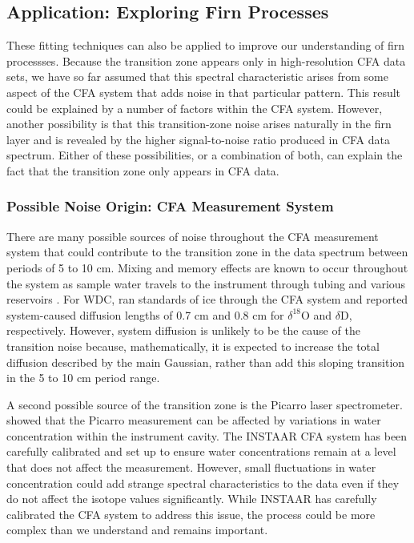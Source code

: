 \documentclass[draft, jgrga]{AGUTeX}
\begin{document}
\begin{article}
\subsection{Application: Exploring Firn Processes}

These fitting techniques can also be applied to improve our understanding of firn processses. Because the transition zone appears only in high-resolution CFA data sets, we have so far assumed that this spectral characteristic arises from some aspect of the CFA system that adds noise in that particular pattern. This result could be explained by a number of factors within the CFA system. However, another possibility is that this transition-zone noise arises naturally in the firn layer and is revealed by the higher signal-to-noise ratio produced in CFA data spectrum. Either of these possibilities, or a combination of both, can explain the fact that the transition zone only appears in CFA data.

\subsubsection{Possible Noise Origin: CFA Measurement System}

There are many possible sources of noise throughout the CFA measurement system that could contribute to the transition zone in the data spectrum between periods of 5 to 10 cm. Mixing and memory effects are known to occur throughout the system as sample water travels to the instrument through tubing and various reservoirs \citep{Gkinis2011a}. For WDC, \citet{Jones2017b} ran standards of ice through the CFA system and reported system-caused diffusion lengths of 0.7 cm and 0.8 cm for $\delta^{18}\mathrm{O}$ and $\delta\mathrm{D}$, respectively. However, system diffusion is unlikely to be the cause of the transition noise because, mathematically, it is expected to increase the total diffusion described by the main Gaussian, rather than add this sloping transition in the 5 to 10 cm period range.

A second possible source of the transition zone is the Picarro laser spectrometer. \citet{Gkinis2011b} showed that the Picarro measurement can be affected by variations in water concentration within the instrument cavity. The INSTAAR CFA system has been carefully calibrated and set up to ensure water concentrations remain at a level that does not affect the measurement. However, small fluctuations in water concentration could add strange spectral characteristics to the data even if they do not affect the isotope values significantly. While INSTAAR has carefully calibrated the CFA system to address this issue, the process could be more complex than we understand and remains important.


\end{article}
\end{document}

